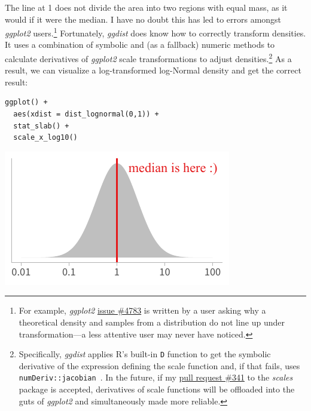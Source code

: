 \documentclass[journal]{vgtc}                     %
\begin{document}
The line at 1 does not divide the area into two regions with equal mass, as it would if it were the median. I have no doubt this has led to errors amongst \textit{ggplot2} users.\footnote{For example, \textit{ggplot2} \href{https://github.com/tidyverse/ggplot2/issues/4783}{issue \#4783} is written by a user asking why a theoretical density and samples from a distribution do not line up under transformation---a less attentive user may never have noticed.} Fortunately, \textit{ggdist} does know how to correctly transform densities. It uses a combination of symbolic and (as a fallback) numeric methods to calculate derivatives of \textit{ggplot2} scale transformations to adjust densities.\footnote{Specifically, \textit{ggdist} applies R's built-in \texttt{D} function to get the symbolic derivative of the expression defining the scale function and, if that fails, uses \texttt{numDeriv::jacobian}~\cite{gilbert2016numderiv}. In the future, if my \href{https://github.com/r-lib/scales/pull/341}{pull request \#341} to the \textit{scales} package is accepted, derivatives of scale functions will be offloaded into the guts of \textit{ggplot2} and simultaneously made more reliable.} As a result, we can visualize a log-transformed log-Normal density and get the correct result:

\noindent
\begin{minipage}{.5\columnwidth}
\small
\begin{verbatim}
ggplot() +
  aes(xdist = dist_lognormal(0,1)) +
  stat_slab() +
  scale_x_log10()
\end{verbatim}
\end{minipage}%
  \begin{minipage}{.4\columnwidth}
    \centering
    \includegraphics[width=1.2\columnwidth]{figs/3-jacobian-correct.pdf}
  \end{minipage}
\hfill\break
\end{document}
